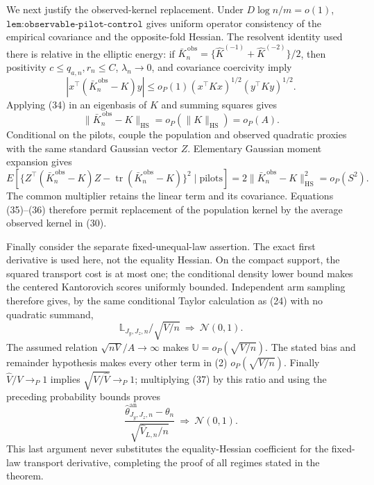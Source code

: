 We next justify the observed-kernel replacement.  Under \(D\log n/m=o(1)\), \(\texttt{lem:observable-pilot-control}\) gives uniform operator consistency of the empirical covariance and the opposite-fold Hessian.  The resolvent identity used there is relative in the elliptic energy: if \(\bar K_n^{\,\mathrm{obs}}=\{\widehat K^{(-1)}+\widehat K^{(-2)}\}/2\), then positivity \(c\le q_{a,n},r_n\le C\), \(\lambda_n\to0\), and covariance coercivity imply
\[
|x^\top(\bar K_n^{\,\mathrm{obs}}-K)y|
\le o_P(1)(x^\top Kx)^{1/2}(y^\top Ky)^{1/2}.
\tag{34}
\]
Applying (34) in an eigenbasis of \(K\) and summing squares gives
\[
\|\bar K_n^{\,\mathrm{obs}}-K\|_{\mathrm{HS}}
=o_P(\|K\|_{\mathrm{HS}})=o_P(A).
\tag{35}
\]
Conditional on the pilots, couple the population and observed quadratic proxies with the same standard Gaussian vector \(Z\).  Elementary Gaussian moment expansion gives
\[
E\!\left[\{Z^\top(\bar K_n^{\,\mathrm{obs}}-K)Z
-\operatorname{tr}(\bar K_n^{\,\mathrm{obs}}-K)\}^2\mid\text{pilots}\right]
=2\|\bar K_n^{\,\mathrm{obs}}-K\|_{\mathrm{HS}}^2=o_P(S^2).
\tag{36}
\]
The common multiplier retains the linear term and its covariance.  Equations (35)--(36) therefore permit replacement of the population kernel by the average observed kernel in (30).

Finally consider the separate fixed-unequal-law assertion.  The exact first derivative is used here, not the equality Hessian.  On the compact support, the squared transport cost is at most one; the conditional density lower bound makes the centered Kantorovich scores uniformly bounded.  Independent arm sampling therefore gives, by the same conditional Taylor calculation as (24) with no quadratic summand,
\[
\mathbb L_{J_y,J_z,n}/\sqrt{V/n}\ \Rightarrow\ \mathcal N(0,1).
\tag{37}
\]
The assumed relation \(\sqrt{nV}/A\to\infty\) makes \(\mathbb U=o_P(\sqrt{V/n})\).  The stated bias and remainder hypothesis makes every other term in (2) \(o_P(\sqrt{V/n})\).  Finally \(\widehat V/V\to_P1\) implies \(\sqrt{V/\widehat V}\to_P1\); multiplying (37) by this ratio and using the preceding probability bounds proves
\[
\frac{\widehat\theta^{\mathrm{an}}_{J_y,J_z,n}-\theta_n}
{\sqrt{\widehat V_{L,n}/n}}\ \Rightarrow\ \mathcal N(0,1).
\]
This last argument never substitutes the equality-Hessian coefficient for the fixed-law transport derivative, completing the proof of all regimes stated in the theorem.